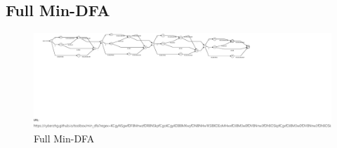 \documentclass[a3paper]{report}
\begin{document}
\pagebreak

\begin{landscape}
    \section*{Full Min-DFA}
\begin{figure}[h]
    \centering
    \includegraphics[scale=2,clip,trim=0 6cm 0 0]{Automatas/automata_03.pdf}
    \caption{Full Min-DFA}
\end{figure}
\end{landscape}
\end{document}
